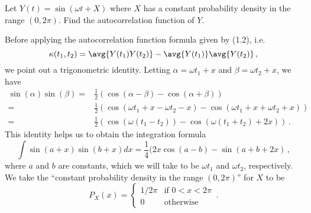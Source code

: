 

Let $Y(t) = \sin(\omega t + X)$ where $X$ has a constant probability density in the range $\left( 0, 2\pi \right)$.
Find the autocorrelation function of $Y$. 

Before applying the autocorrelation function formula given by (1.2), i.e.
\begin{equation*}
    \kappa(t_1 , t_2) = \avg{Y(t_1) Y(t_2)} - \avg{Y(t_1)} \avg{Y(t_2)}
    \, ,
\end{equation*}
we point out a trigonometric identity.
Letting $\alpha = \omega t_1 + x$ and $\beta = \omega t_2 + x$, we have
\begin{align*}
  \sin(\alpha)\sin(\beta) = & \frac{1}{2} (\cos(\alpha - \beta) - \cos(\alpha + \beta) ) \\
  = &  \frac{1}{2} (\cos(\omega t_1 + x - \omega t_2 - x) - \cos(\omega t_1 + x + \omega t_2 + x) ) \\
  = & \frac{1}{2} ( \cos(\omega(t_1 - t_2 ) ) - \cos(\omega(t_1 + t_2 ) + 2x) )
  \, .
\end{align*}
This identity helps us to obtain the integration formula
\begin{equation*}
  \int \sin(a + x) \sin(b + x) dx = \frac{1}{4} (2x \cos(a-b) - \sin(a + b + 2x)
  \, ,
\end{equation*}
where $a$ and $b$ are constants, which we will take to be $\omega t_1$ and $\omega t_2$, respectively.
We take the ``constant probability density in the range $(0, 2\pi)$'' for $X$ to be
\begin{equation*}
  P_{X}(x)=
  \begin{cases}
    1 / 2\pi & \text{if } 0 < x < 2\pi \\
    0 & \text{otherwise}
  \end{cases}
  \, .
\end{equation*}

